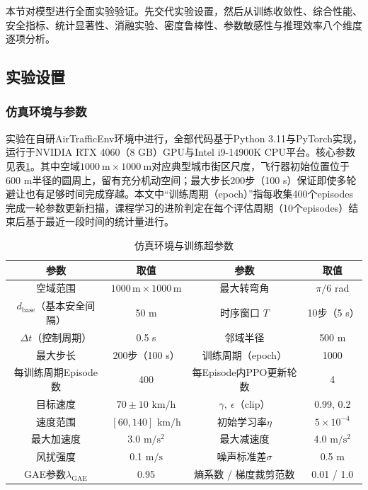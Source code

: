 \documentclass[12pt,a4paper,UTF8]{ctexart}
\begin{document}
本节对模型进行全面实验验证。先交代实验设置，然后从训练收敛性、综合性能、安全指标、统计显著性、消融实验、密度鲁棒性、参数敏感性与推理效率八个维度逐项分析。

\subsection{实验设置}

\subsubsection{仿真环境与参数}

实验在自研AirTrafficEnv环境中进行，全部代码基于Python 3.11与PyTorch实现，运行于NVIDIA RTX 4060（8 GB）GPU与Intel i9-14900K CPU平台。核心参数见表\ref{tab:env}。其中空域$1000\ \mathrm{m}\times1000\ \mathrm{m}$对应典型城市街区尺度，飞行器初始位置位于600 m半径的圆周上，留有充分机动空间；最大步长200步（100 s）保证即使多轮避让也有足够时间完成穿越。本文中“训练周期（epoch）”指每收集400个episodes完成一轮参数更新扫描，课程学习的进阶判定在每个评估周期（10个episodes）结束后基于最近一段时间的统计量进行。

\begin{table}[H]
    \centering\small
    \caption{仿真环境与训练超参数}
    \label{tab:env}
    \begin{tabular}{|c|c|c|c|}
        \hline
        \textbf{参数} & \textbf{取值} & \textbf{参数} & \textbf{取值} \\
        \hline
        空域范围 & $1000\,\mathrm{m}\times1000\,\mathrm{m}$ & 最大转弯角 & $\pi/6$ rad \\
        $d_{\text{base}}$（基本安全间隔） & 50 m & 时序窗口 $T$ & 10步（5 s） \\
        $\Delta t$（控制周期） & 0.5 s & 邻域半径 & 500 m \\
        最大步长 & 200步（100 s） & 训练周期（epoch） & 1000 \\
        每训练周期Episode数 & 400 & 每Episode内PPO更新轮数 & 4 \\
        目标速度 & $70\pm10$ $\mathrm{km/h}$ & $\gamma,\ \epsilon$（clip） & 0.99, 0.2 \\
        速度范围 & $[60, 140]$ $\mathrm{km/h}$ & 初始学习率$\eta$ & $5\times10^{-4}$ \\
        最大加速度 & 3.0 $\mathrm{m/s^2}$ & 最大减速度 & 4.0 $\mathrm{m/s^2}$ \\
        风扰强度 & 0.1 $\mathrm{m/s}$ & 噪声标准差$\sigma$ & 0.5 m \\
        GAE参数$\lambda_{\text{GAE}}$ & 0.95 & 熵系数 / 梯度裁剪范数 & 0.01 / 1.0 \\
        \hline
    \end{tabular}
\end{table}
\end{document}
